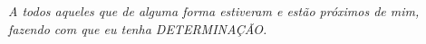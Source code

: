 \begin{dedicatoria}
   \vspace*{\fill}
   \centering
   \noindent
   \textit{A todos aqueles que de alguma forma estiveram e est\~ao pr\'oximos de mim,\\ fazendo com que eu tenha DETERMINA\c{C}\~AO.}
   \vspace*{\fill}
\end{dedicatoria}